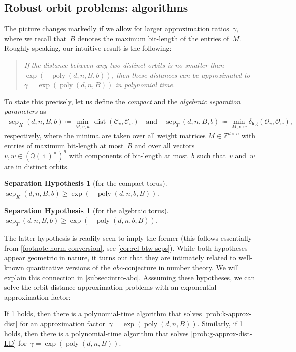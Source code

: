 \documentclass[a4paper,USenglish,cleveref,numberwithinsect]{lipics-v2021}
\newtheorem{sephypothesis}[theorem]{Separation Hypothesis}\crefname{sephypothesis}{Separation Hypothesis}{Separation Hypotheses}
\DeclareMathOperator{\poly}{poly}
\DeclareMathOperator{\sep}{sep}
\DeclareMathOperator{\ii}{i}
\DeclareMathOperator{\dist}{dist}
\newcommand{\distLD}{\delta_{\log}}
\newcommand{\QQ}{\mathbb{Q}}
\newcommand{\ZZ}{\mathbb{Z}}
\newcommand{\OO}{\ensuremath{\mathcal{O}}}
\newcommand{\KK}{\ensuremath{\mathcal{C}}}
\newcommand{\abc}{\texorpdfstring{$abc$}{abc}}
\numberwithin{equation}{section}
\begin{document}
\subsection{Robust orbit problems: algorithms}\label{subsec:intro algos}
The picture changes markedly if we allow for larger approximation ratios~$\gamma$,
where we recall that~$B$ denotes the maximum bit-length of the entries of~$M$.
Roughly speaking, our intuitive result is the following:
\begin{quote}
  \emph{If the distance between any two distinct orbits is no smaller than $\exp(-\poly(d,n,B,b))$,
  then these distances can be approximated to~$\gamma=\exp(\poly(d,n,B))$ in polynomial time.}
\end{quote}
To state this precisely, let us define the \emph{compact} and the \emph{algebraic separation parameters} as
\begin{align}\label{eq:def-sep}
  \sep_K(d,n,B,b) \coloneqq \min_{M,v,w} \dist(\KK_v,\KK_w)
\quad\text{and}\quad
  \sep_T(d,n,B,b) \coloneqq \min_{M,v,w} \distLD(\OO_v,\OO_w),
\end{align}
respectively, where the minima are taken over all weight matrices $M\in\ZZ^{d\times n}$
with entries of maximum bit-length at most~$B$ and over all vectors $v,w\in (\QQ(\ii)^\times)^n$
with components of bit-length at most~$b$ such that~$v$ and~$w$ are in distinct orbits.

\begin{sephypothesis}[for the compact torus]\label{hyp:compact-separation}
$\sep_{K}(d,n,B,b)\geq\exp(-\poly(d,n,b,B))$.
\end{sephypothesis}

\begin{sephypothesis}[for the algebraic torus]\label{hyp:sep}
$\sep_T(d,n,B,b)\geq \exp(-\poly(d,n,b,B))$. %
\end{sephypothesis}

The latter hypothesis is readily seen to imply the former
(this follows essentially from \cref{footnote:norm conversion},
see \cref{cor:rel-btw-seps}).
While both hypotheses appear geometric in nature, it turns out that they are intimately related
to well-known quantitative versions
of the \abc-conjecture in number theory.
We will explain this connection in \cref{subsec:intro-abc}.
Asssuming these hypotheses, we can solve the orbit distance approximation problems
with an exponential approximation factor:

\begin{theorem}\label{thm:intro-approximation-algorithm}
If \cref{hyp:compact-separation} holds, then there is a polynomial-time algorithm
that solves \cref{prob:k-approx-dist}
for an approximation factor~$\gamma = \exp(\poly(d,n,B))$.
%
Similarly, if \cref{hyp:sep} holds, then there is a polynomial-time algorithm
that solves \cref{prob:g-approx-dist-LD}
for~$\gamma = \exp(\poly(d,n,B))$.
\end{theorem}
\end{document}
